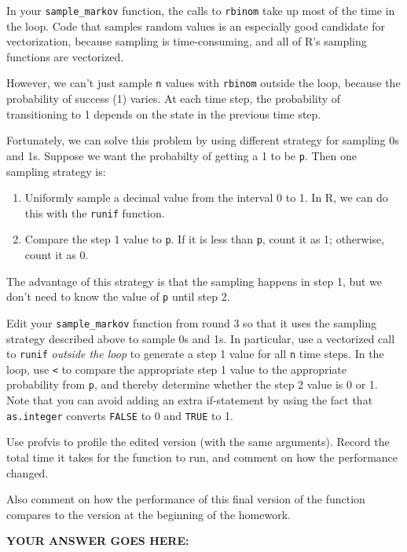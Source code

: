 \documentclass[
]{article}
\providecommand{\tightlist}{%
  \setlength{\itemsep}{0pt}\setlength{\parskip}{0pt}}
\begin{document}
In your \texttt{sample\_markov} function, the calls to \texttt{rbinom}
take up most of the time in the loop. Code that samples random values is
an especially good candidate for vectorization, because sampling is
time-consuming, and all of R's sampling functions are vectorized.

However, we can't just sample \texttt{n} values with \texttt{rbinom}
outside the loop, because the probability of success (1) varies. At each
time step, the probability of transitioning to 1 depends on the state in
the previous time step.

Fortunately, we can solve this problem by using different strategy for
sampling 0s and 1s. Suppose we want the probabilty of getting a 1 to be
\texttt{p}. Then one sampling strategy is:

\begin{enumerate}
\def\labelenumi{\arabic{enumi}.}
\tightlist
\item
  Uniformly sample a decimal value from the interval 0 to 1. In R, we
  can do this with the \texttt{runif} function.
\item
  Compare the step 1 value to \texttt{p}. If it is less than \texttt{p},
  count it as 1; otherwise, count it as 0.
\end{enumerate}

The advantage of this strategy is that the sampling happens in step 1,
but we don't need to know the value of \texttt{p} until step 2.

Edit your \texttt{sample\_markov} function from round 3 so that it uses
the sampling strategy described above to sample 0s and 1s. In
particular, use a vectorized call to \texttt{runif} \emph{outside the
loop} to generate a step 1 value for all \texttt{n} time steps. In the
loop, use \texttt{\textless{}} to compare the appropriate step 1 value
to the appropriate probability from \texttt{p}, and thereby determine
whether the step 2 value is 0 or 1. Note that you can avoid adding an
extra if-statement by using the fact that \texttt{as.integer} converts
\texttt{FALSE} to 0 and \texttt{TRUE} to 1.

Use profvis to profile the edited version (with the same arguments).
Record the total time it takes for the function to run, and comment on
how the performance changed.

Also comment on how the performance of this final version of the
function compares to the version at the beginning of the homework.

\textbf{YOUR ANSWER GOES HERE:}
\end{document}
